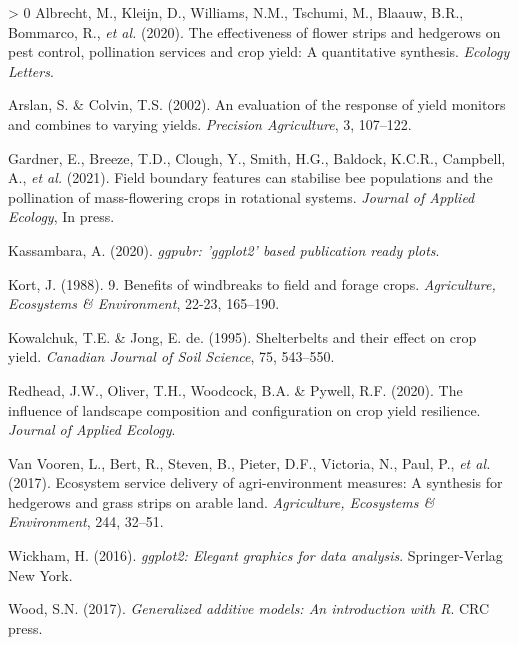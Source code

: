 \documentclass[]{elsarticle} %
\newlength{\cslhangindent}
\newenvironment{CSLReferences}[3] %
 {%
  \setlength{\parindent}{0pt}
  \ifodd #1 \everypar{\setlength{\hangindent}{\cslhangindent}}\ignorespaces\fi
  \ifnum #2 > 0
  \setlength{\parskip}{#2\baselineskip}
  \fi
 }%
 {}
\begin{document}
\hypertarget{refs}{}
\begin{CSLReferences}{1}{0}
\leavevmode\hypertarget{ref-albrecht2020}{}%
Albrecht, M., Kleijn, D., Williams, N.M., Tschumi, M., Blaauw, B.R., Bommarco, R., \emph{et al.} (2020). The effectiveness of flower strips and hedgerows on pest control, pollination services and crop yield: A quantitative synthesis. \emph{Ecology Letters}.

\leavevmode\hypertarget{ref-arslan2002}{}%
Arslan, S. \& Colvin, T.S. (2002). An evaluation of the response of yield monitors and combines to varying yields. \emph{Precision Agriculture}, 3, 107--122.

\leavevmode\hypertarget{ref-gardner2021}{}%
Gardner, E., Breeze, T.D., Clough, Y., Smith, H.G., Baldock, K.C.R., Campbell, A., \emph{et al.} (2021). Field boundary features can stabilise bee populations and the pollination of mass-flowering crops in rotational systems. \emph{Journal of Applied Ecology}, In press.

\leavevmode\hypertarget{ref-kassambara2020}{}%
Kassambara, A. (2020). \emph{{ggpubr}: 'ggplot2' based publication ready plots}.

\leavevmode\hypertarget{ref-kort1988}{}%
Kort, J. (1988). 9. Benefits of windbreaks to field and forage crops. \emph{Agriculture, Ecosystems {\&} Environment}, 22-23, 165--190.

\leavevmode\hypertarget{ref-kowalchuk1995}{}%
Kowalchuk, T.E. \& Jong, E. de. (1995). Shelterbelts and their effect on crop yield. \emph{Canadian Journal of Soil Science}, 75, 543--550.

\leavevmode\hypertarget{ref-redhead2020}{}%
Redhead, J.W., Oliver, T.H., Woodcock, B.A. \& Pywell, R.F. (2020). The influence of landscape composition and configuration on crop yield resilience. \emph{Journal of Applied Ecology}.

\leavevmode\hypertarget{ref-vanVooren2017}{}%
Van Vooren, L., Bert, R., Steven, B., Pieter, D.F., Victoria, N., Paul, P., \emph{et al.} (2017). Ecosystem service delivery of agri-environment measures: A synthesis for hedgerows and grass strips on arable land. \emph{Agriculture, Ecosystems {\&} Environment}, 244, 32--51.

\leavevmode\hypertarget{ref-wickham2016}{}%
Wickham, H. (2016). \emph{{ggplot2}: Elegant graphics for data analysis}. Springer-Verlag New York.

\leavevmode\hypertarget{ref-wood2017}{}%
Wood, S.N. (2017). \emph{Generalized additive models: An introduction with {R}}. CRC press.

\end{CSLReferences}
\end{document}
